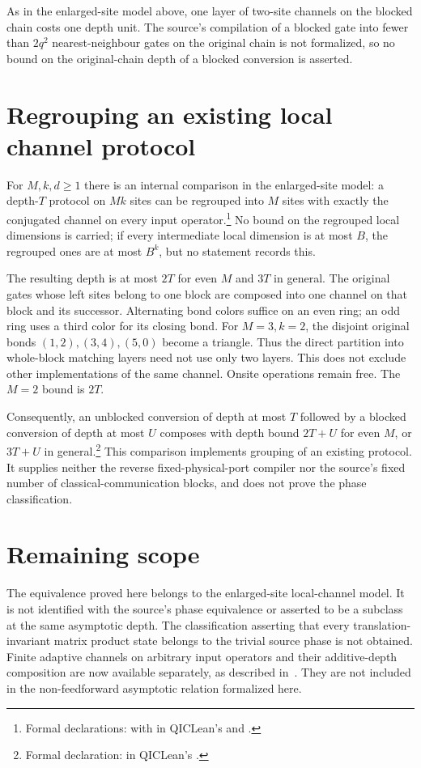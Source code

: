 \documentclass{article}
\begin{document}
As in the enlarged-site model above, one layer of two-site channels on the
blocked chain costs one depth unit. The source's compilation of a blocked
gate into fewer than $2q^2$ nearest-neighbour gates on the original chain is
not formalized, so no bound on the original-chain depth of a blocked
conversion is asserted.

\section{Regrouping an existing local channel protocol}
For $M,k,d\ge1$ there is an internal comparison in the enlarged-site model: a depth-$T$
protocol on $Mk$ sites can be regrouped into $M$ sites with exactly the
conjugated channel on every input operator.\footnote{Formal
    declarations:  with
     in QICLean's
     and
    .}
No bound on the regrouped local dimensions is carried; if every
intermediate local dimension is at most $B$, the regrouped ones are at most
$B^k$, but no statement records this.

The resulting depth is at most $2T$ for even $M$ and $3T$ in general.
The original gates whose left sites belong to one block are composed into
one channel on that block and its successor. Alternating bond colors suffice
on an even ring; an odd ring uses a third color for its closing bond.
For $M=3,k=2$, the disjoint original bonds $(1,2),(3,4),(5,0)$ become a
triangle. Thus the direct partition into whole-block matching layers need
not use only two layers. This does not exclude other implementations of the
same channel. Onsite operations remain free. The $M=2$ bound is $2T$.

Consequently, an unblocked conversion of depth at most $T$ followed by a
blocked conversion of depth at most $U$ composes with depth bound $2T+U$
for even $M$, or $3T+U$ in general.\footnote{Formal declaration:
     in QICLean's
    .}
This comparison implements grouping of an existing protocol. It supplies
neither the reverse fixed-physical-port compiler nor the source's fixed
number of classical-communication blocks, and does not prove the phase
classification.

\section{Remaining scope}
The equivalence proved here belongs to the enlarged-site local-channel model.
It is not identified with the source's phase equivalence or asserted to be
a subclass at the same asymptotic depth. The classification asserting that
every translation-invariant matrix product state belongs to the trivial
source phase is not obtained. Finite adaptive channels on arbitrary input
operators and their additive-depth composition are now available separately,
as described in~\cite{gap:psc21_adaptive_channel_round_scope}. They are not
included in the non-feedforward asymptotic relation formalized here.
\end{document}
